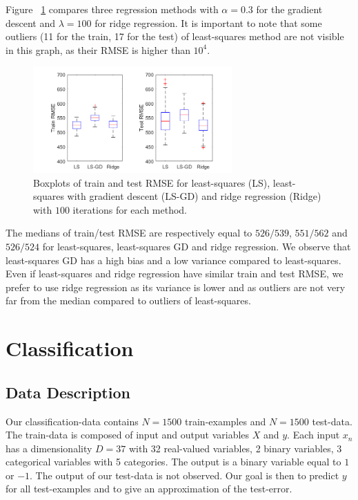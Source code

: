 \documentclass{article} %
\begin{document}
Figure ~\ref{fig:reg_compareMethods} compares three regression methods with $\alpha = 0.3$ for the gradient descent and $\lambda = 100$ for ridge regression. It is important to note that some outliers (11 for the train, 17 for the test) of least-squares method are not visible in this graph, as their RMSE is higher than $10^4$.

\begin{figure}[!h] %
	\center
	\includegraphics[width=3in]{figures/comparisonReg.png}
	\caption{Boxplots of train and test RMSE for least-squares (LS), least-squares with gradient descent (LS-GD) and ridge regression (Ridge) with $100$ iterations for each method.}
	\label{fig:reg_compareMethods}
\end{figure}

The medians of train/test RMSE are respectively equal to $526/539$, $551/562$ and $526/524$ for least-squares, least-squares GD and ridge regression. We observe that least-squares GD has a high bias and a low variance compared to least-squares. Even if least-squares and ridge regression have similar train and test RMSE, we prefer to use ridge regression as its variance is lower and as outliers are not very far from the median compared to outliers of least-squares.

\section{Classification}
\subsection{Data Description}
Our classification-data contains $N=1500$ train-examples and $N=1500$ test-data. The train-data is composed of input and output variables $X$ and $y$. Each input $x_n$ has a dimensionality $D=37$ with 32 real-valued variables, 2 binary variables, 3 categorical variables with 5 categories. The output is a binary variable equal to $1$ or $-1$. The output of our test-data is not observed. Our goal is then to predict $y$ for all test-examples and to give an approximation of the test-error.
\end{document}
